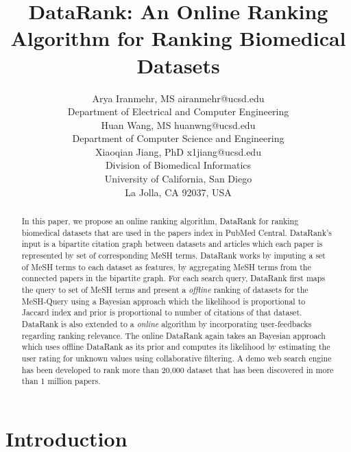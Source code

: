 \documentclass[twoside,11pt]{article}
\begin{document}
\title{DataRank: An Online Ranking Algorithm for Ranking Biomedical Datasets}

\author{\name Arya Iranmehr, MS \email airanmehr@ucsd.edu \\
       \addr Department of Electrical and Computer Engineering\\
       \AND
       \name Huan Wang, MS \email huanwng@ucsd.edu \\
       \addr Department of Computer Science and Engineering\\
       \AND
       \name Xiaoqian Jiang, PhD \email x1jiang@ucsd.edu \\
       \addr Division of Biomedical Informatics\\
       University of California, San Diego\\
       La Jolla, CA 92037, USA
       }

\editor{}

\maketitle
\begin{abstract} 
In this paper, we propose an online ranking algorithm, DataRank for ranking biomedical datasets that are used in the papers index in PubMed Central. DataRank's input is a bipartite citation graph between datasets and articles which each paper is represented by set of corresponding MeSH terms. DataRank works by imputing a set of MeSH terms to each dataset as features, by aggregating MeSH terms from the connected papers in the bipartite graph. For each search query, DataRank first maps the query to set of MeSH terms and present a \emph{offline} ranking of datasets for the MeSH-Query using a Bayesian approach which the likelihood is proportional to Jaccard index and prior is proportional to number of citations of that dataset. DataRank is also extended to a \emph{online} algorithm by incorporating user-feedbacks regarding ranking relevance. The online DataRank again takes an Bayesian approach  which uses offline DataRank as its prior and computes its likelihood by estimating the user rating for unknown values using collaborative filtering. A demo web search engine has been developed to rank more than 20,000 dataset that has been discovered in more than 1 million papers.
\end{abstract} 


\section{Introduction} \label{sec:introduction}
\cite{ptm} 
\end{document}
